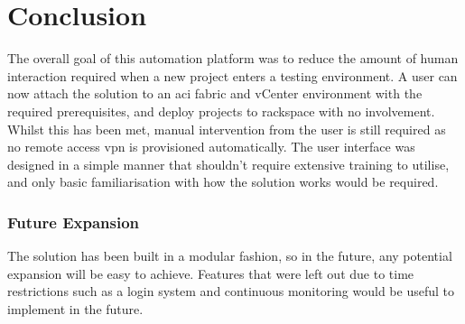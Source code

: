 \chapter{Conclusion}
\label{chap:conclusion}
The overall goal of this automation platform was to reduce the amount of human interaction required when a new project enters a testing environment. A user can now attach the solution to an \gls{aci} fabric and vCenter environment with the required prerequisites, and deploy projects to rackspace with no involvement. Whilst this has been met, manual intervention from the user is still required as no remote access \gls{vpn} is provisioned automatically.
The user interface was designed in a simple manner that shouldn't require extensive training to utilise, and only basic familiarisation with how the solution works would be required.


\subsection{Future Expansion}
\label{sec:future-expansion}
The solution has been built in a modular fashion, so in the future,  any potential expansion will be easy to achieve. Features that were left out due to time restrictions such as a login system and continuous monitoring would be useful to implement in the future.
